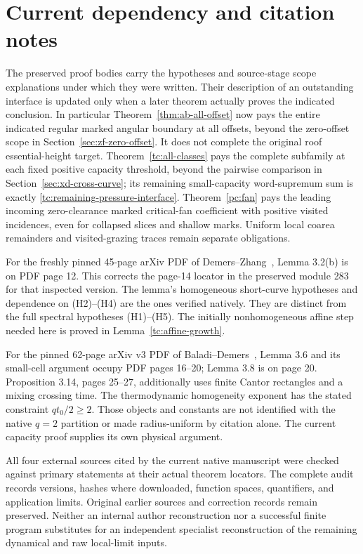 \section{Current dependency and citation notes}
The preserved proof bodies carry the hypotheses and source-stage
scope explanations under which they were written. Their description
of an outstanding interface is updated only when a later theorem
actually proves the indicated conclusion. In particular
Theorem~\ref{thm:ab-all-offset} now pays the entire indicated regular
marked angular boundary at all offsets, beyond the zero-offset
scope in Section~\ref{sec:zf-zero-offset}. It does not complete
the original roof essential-height target.
Theorem~\ref{tc:all-classes} pays the complete subfamily at
each fixed positive capacity threshold, beyond the pairwise comparison in
Section~\ref{sec:xd-cross-curve}; its remaining small-capacity
word-supremum sum is exactly \eqref{tc:remaining-pressure-interface}.
Theorem~\ref{pc:fan} pays the leading incoming zero-clearance
marked critical-fan coefficient with positive visited incidences,
even for collapsed slices and shallow marks. Uniform local coarea
remainders and visited-grazing traces remain separate obligations.

For the freshly pinned 45-page arXiv PDF of
Demers--Zhang~\cite{DZUniform}, Lemma 3.2(b) is on PDF page 12.
This corrects the page-14 locator in the preserved module 283 for
that inspected version. The lemma's homogeneous short-curve
hypotheses and dependence on (H2)--(H4) are the ones verified
natively. They are distinct from the full spectral hypotheses
(H1)--(H5). The initially nonhomogeneous affine step needed here
is proved in Lemma~\ref{tc:affine-growth}.

For the pinned 62-page arXiv v3 PDF of
Baladi--Demers~\cite{BDPressure}, Lemma 3.6 and its small-cell
argument occupy PDF pages 16--20; Lemma 3.8 is on page 20.
Proposition 3.14, pages 25--27, additionally uses finite Cantor
rectangles and a mixing crossing time. The thermodynamic
homogeneity exponent has the stated constraint $qt_0/2\ge2$.
Those objects and constants are not identified with the native
$q=2$ partition or made radius-uniform by citation alone.
The current capacity proof supplies its own physical argument.

All four external sources cited by the current native manuscript
were checked against primary statements at their actual theorem
locators. The complete audit records versions, hashes where
downloaded, function spaces, quantifiers, and application limits.
Original earlier sources and correction records remain preserved.
Neither an internal author reconstruction nor a successful finite
program substitutes for an independent specialist reconstruction
of the remaining dynamical and raw local-limit inputs.
